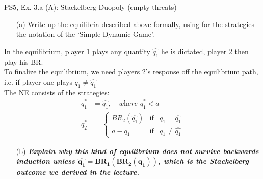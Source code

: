 \begin{frame}{PS5, Ex. 3.a (A): Stackelberg Duopoly (empty threats)}
  \begin{multicols}{2}
    \begin{itemize}
      \item[(a)] Write up the equilibria described above formally, using for the strategies the notation of the ‘Simple Dynamic Game’.
    \end{itemize}
    In the equilibrium, player 1 plays any quantity $\widehat{q_1}$ he is dictated, player 2 then play his BR.\\\medskip
    To finalize the equilibrium, we need players 2's response off the equilibrium path, i.e. if player one plays $q_1\neq\widehat{q_1}$ \\\medskip
    The NE consists of the strategies:
    \begin{align*}
    q_1^*&=\widehat{q_1},\quad\textit{where }q_1^*<a \\
    q_2^*&=\left\{
      \begin{array}{lcl}
          BR_2(\widehat{q_1}) & \text{if} & q_1=\widehat{q_1} \\
          a-q_1 & \text{if} & q_1\neq\widehat{q_1}
      \end{array}\right.
    \end{align*}
    \vfill\null \columnbreak
    \begin{itemize}
      \item[(b)] \textbf{\textit{Explain why this kind of equilibrium does not survive backwards induction unless $\bm{\widehat{q_1}=BR_1\left(BR_2(q_1)\right)}$, which is the Stackelberg outcome we derived in the lecture.}}
    \end{itemize}
    \vfill\null
  \end{multicols}
\end{frame}

